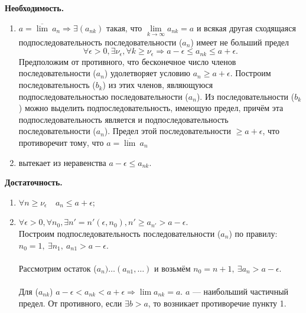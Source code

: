 \begin{Proof} \textbf{Необходимость.}
	\begin{enumerate}
		\item  $a = \overline{\lim}\ a_n \Rightarrow \exists(a_{nk})$ такая, что $\lim\limits_{k\to\infty} a_{nk} = a$ и всякая другая сходящаяся подпоследовательность последовательности ($a_n$) имеет не больший предел
		$$\forall\epsilon > 0, \exists\nu_\epsilon, \forall k \ge \nu_\epsilon \Rightarrow a - \epsilon \le a_{nk} \le a + \epsilon.$$
		Предположим от противного, что бесконечное число членов последовательности ($a_n$)  удолетворяет условию $a_n \ge a + \epsilon$. Построим последовательность ($b_k$) из этих членов, являющуюся подпоследовательностью последовательности ($a_n$). Из последовательности ($b_k$) можно выделить подпоследовательность, имеющую предел, причём эта подпоследовательность является и подпоследовательность последовательности ($a_n$). Предел этой последовательности $\ge a + \epsilon$, что противоречит тому, что $a = \overline{\lim}\ a_n$\\
		\item вытекает из неравенства $a - \epsilon \le a_{nk}$.
	\end{enumerate}
	\textbf{Достаточность.}\begin{enumerate}
		\item $\forall n \ge \nu_\epsilon \quad  a_n \le a + \epsilon$;
		\item $\forall \epsilon > 0, \forall n_0, \exists n' = n'(\epsilon, n_0), n'\ge a_{n'} > a - \epsilon$.\\
		Построим подпоследовательность последовательности ($a_n$) по правилу: $n_0 = 1,\   \exists n_1,\   a_{n1} > a - \epsilon$.\\\\
		Рассмотрим остаток ($a_n) \dots (a_{n1}, \dots)$ и возьмём $n_0 = n + 1,\ \exists a_n > a - \epsilon.$\\\\
		Для ($a_{nk}$) $a - \epsilon < a_{nk} < a + \epsilon \Rightarrow \lim a_{nk} = a$. $a$ --- наибольший частичный предел. От противного, если $\exists b > a$, то возникает противоречие пункту 1.
	\end{enumerate}
\end{Proof}

